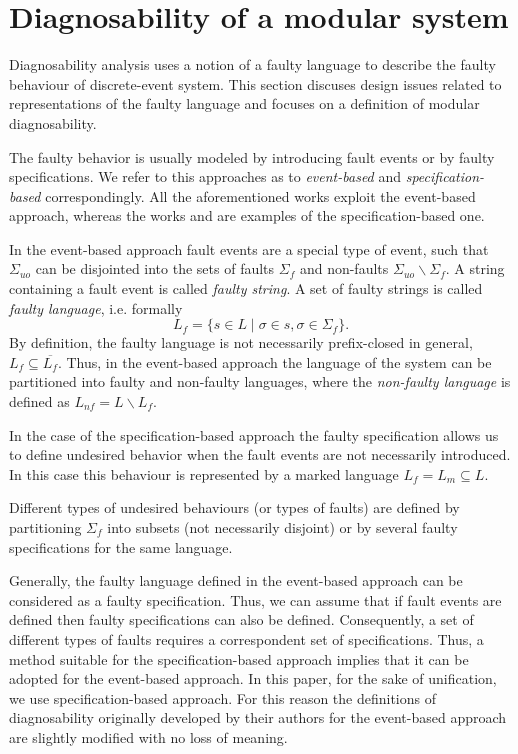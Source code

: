 \documentclass[a4paper, 10pt, conference]{ieeeconf}
\begin{document}
\section{Diagnosability of a modular system}
\label{sec:Diagnosability}
Diagnosability analysis uses a notion of a faulty language to describe the
faulty behaviour of discrete-event system. This section discuses design issues
related to representations of the faulty language and focuses on a definition
of modular diagnosability.

The faulty behavior is usually modeled by introducing fault events or by faulty
specifications. We refer to this approaches as to \emph{event-based} and
\emph{specification-based} correspondingly. All the aforementioned works exploit
the event-based approach, whereas the works \cite{zhou_decentralized_2008} and
\cite{sartini_methodology_2010} are examples of the specification-based one.

In the event-based approach fault events are a special type of event, such that
$\Sigma_{uo}$ can be disjointed into the sets of faults $\Sigma_f$ and
non-faults $\Sigma_{uo}\backslash \Sigma_f$. A string containing a fault event
is called \emph{faulty string}. A set of faulty strings is called \emph{faulty
language}, i.e. formally 
$$L_f = \{ s \in L \mid \sigma \in s, \sigma \in \Sigma_f\}.$$ 
By definition, the faulty language is not necessarily prefix-closed in general,
$L_f \subseteq \overline{L_f}$. Thus, in the event-based approach the language
of the system can be partitioned into faulty and non-faulty languages, where the
\emph{non-faulty language} is defined as $L_{nf} = L \backslash L_f$.

In the case of the specification-based approach the faulty specification allows
us to define undesired behavior when the fault events are not necessarily
introduced. In this case this behaviour is represented by a marked language $L_f
= L_m \subseteq L$. 

Different types of undesired behaviours (or types of faults) are defined by
partitioning $\Sigma_f$ into subsets (not necessarily disjoint) or by several
faulty specifications for the same language. 

Generally, the faulty language defined in the event-based approach can be
considered as a faulty specification. Thus, we can assume that if fault events
are defined then faulty specifications can also be defined.
Consequently, a set of different types of faults requires a correspondent set of
specifications.
Thus, a method suitable for the specification-based approach implies that it can
be adopted for the event-based approach. In this paper, for the sake of
unification, we use specification-based approach. For this reason the
definitions of diagnosability originally developed by their authors for the
event-based approach are slightly modified with no loss of meaning.
\end{document}
